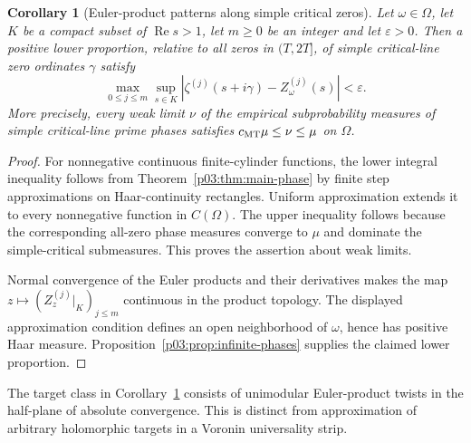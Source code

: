 \documentclass[11pt,letterpaper]{article}
\newtheorem{corollary}[theorem]{Corollary}
\theoremstyle{definition}
\theoremstyle{remark}
\newcommand{\eps}{\varepsilon}
\renewcommand{\Re}{\operatorname{Re}}
\newcommand{\1}{\mathbf 1}
\begin{document}
\begin{corollary}[Euler-product patterns along simple critical zeros]
\label{p03:cor:Euler-patterns}
Let $\omega\in\Omega$, let $K$ be a compact subset of $\Re s>1$,
let $m\ge0$ be an integer and let $\eps>0$. Then a positive lower
proportion, relative to all zeros in $(T,2T]$, of simple critical-line
zero ordinates $\gamma$ satisfy
\[
 \max_{0\le j\le m}\sup_{s\in K}
 |\zeta^{(j)}(s+i\gamma)-Z_\omega^{(j)}(s)|<\eps.
\]
More precisely, every weak limit $\nu$ of the empirical subprobability
measures of simple critical-line prime phases satisfies
$c_{\rm MT}\mu\le\nu\le\mu$ on $\Omega$.
\end{corollary}
\begin{proof}
For nonnegative continuous finite-cylinder functions, the lower
integral inequality follows from Theorem~\ref{p03:thm:main-phase} by
finite step approximations on Haar-continuity rectangles. Uniform
approximation extends it to every nonnegative function in
$C(\Omega)$. The upper inequality follows because the corresponding
all-zero phase measures converge to $\mu$ and dominate the
simple-critical submeasures. This proves the assertion about weak
limits.

Normal convergence of the Euler products and their derivatives
makes the map $z\mapsto (Z_z^{(j)}|_K)_{j\le m}$ continuous in
the product topology. The displayed approximation condition defines
an open neighborhood of $\omega$, hence has positive Haar measure.
Proposition~\ref{p03:prop:infinite-phases} supplies the claimed lower
proportion.
\end{proof}

The target class in Corollary~\ref{p03:cor:Euler-patterns} consists of
unimodular Euler-product twists in the half-plane of absolute
convergence. This is distinct from approximation of arbitrary
holomorphic targets in a Voronin universality strip.
\end{document}
